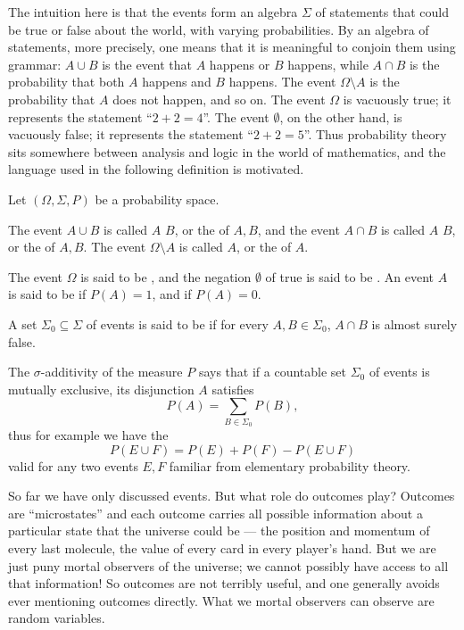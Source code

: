 \begin{subsec}
The intuition here is that the events form an algebra $\Sigma$ of statements that could be true or false about the world, with varying probabilities.
By an algebra of statements, more precisely, one means that it is meaningful to conjoin them using grammar: $A \cup B$ is the event that $A$ happens or $B$ happens, while $A \cap B$ is the probability that both $A$ happens and $B$ happens. The event $\Omega \setminus A$ is the probability that $A$ does not happen, and so on.
The event $\Omega$ is vacuously true; it represents the statement ``$2 + 2 = 4$''.
The event $\emptyset$, on the other hand, is vacuously false; it represents the statement ``$2 + 2 = 5$''.
Thus probability theory sits somewhere between analysis and logic in the world of mathematics, and the language used in the following definition is motivated.
\end{subsec}

\begin{definition}
Let $(\Omega, \Sigma, P)$ be a probability space.

The event $A \cup B$ is called $A$  $B$, or the  of $A,B$, and the event $A \cap B$ is called $A$  $B$, or the  of $A,B$.
The event $\Omega \setminus A$ is called  $A$, or the  of $A$.

The event $\Omega$ is said to be , and the negation $\emptyset$ of true is said to be .
An event $A$ is said to be  if $P(A) = 1$, and  if $P(A) = 0$.

A set $\Sigma_{0} \subseteq \Sigma$ of events is said to be  if for every $A, B \in \Sigma_{0}$, $A \cap B$ is almost surely false.
\end{definition}

\begin{subsec}
The $\sigma$-additivity of the measure $P$ says that if a countable set $\Sigma_{0}$ of events is mutually exclusive, its disjunction $A$ satisfies
\[P(A) = \sum_{B \in \Sigma_{0}} P(B),\]
thus for example we have the 
\[P(E \cup F) = P(E) + P(F) - P(E \cup F)\]
valid for any two events $E,F$ familiar from elementary probability theory.
\end{subsec}

\begin{subsec}
So far we have only discussed events. But what role do outcomes play?
Outcomes are ``microstates'' and each outcome carries all possible information about a particular state that the universe could be --- the position and momentum of every last molecule, the value of every card in every player's hand.
But we are just puny mortal observers of the universe; we cannot possibly have access to all that information!
So outcomes are not terribly useful, and one generally avoids ever mentioning outcomes directly.
What we mortal observers can observe are random variables.
\end{subsec}

